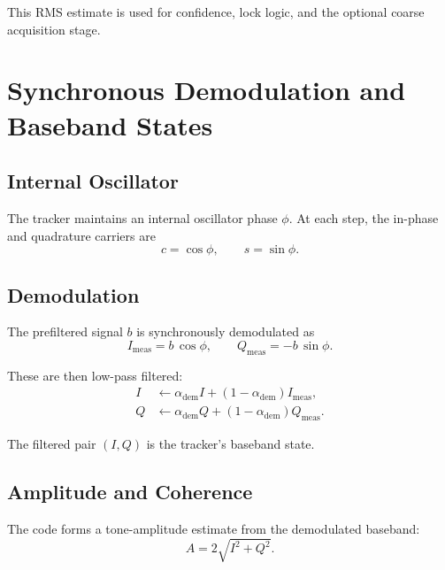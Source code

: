 \documentclass[conference]{IEEEtran}
\begin{document}
    This RMS estimate is used for confidence, lock logic, and the optional coarse
    acquisition stage.

    \section{Synchronous Demodulation and Baseband States}

    \subsection{Internal Oscillator}

    The tracker maintains an internal oscillator phase \(\phi\). At each step,
    the in-phase and quadrature carriers are
    \begin{equation}
        c = \cos\phi,
        \qquad
        s = \sin\phi.
    \end{equation}

    \subsection{Demodulation}

    The prefiltered signal \(b\) is synchronously demodulated as
    \begin{equation}
        I_{\mathrm{meas}} = b\,\cos\phi,
        \qquad
        Q_{\mathrm{meas}} = -b\,\sin\phi.
    \end{equation}

    These are then low-pass filtered:
    \begin{align}
        I &\leftarrow \alpha_{\mathrm{dem}} I + (1-\alpha_{\mathrm{dem}})I_{\mathrm{meas}},\\
        Q &\leftarrow \alpha_{\mathrm{dem}} Q + (1-\alpha_{\mathrm{dem}})Q_{\mathrm{meas}}.
    \end{align}

    The filtered pair \((I,Q)\) is the tracker’s baseband state.

    \subsection{Amplitude and Coherence}

    The code forms a tone-amplitude estimate from the demodulated baseband:
    \begin{equation}
        A = 2\sqrt{I^2 + Q^2}.
    \end{equation}
\end{document}
